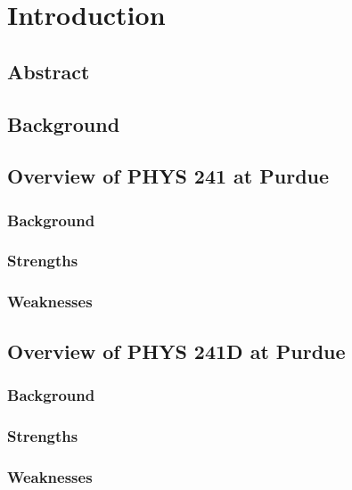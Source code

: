 \chapter[Chapter 1: Introduction]{Introduction}

\section{Abstract}

\section{Background}

\section{Overview of PHYS 241 at Purdue}

\subsection{Background}
\subsection{Strengths}
\subsection{Weaknesses}

\section{Overview of PHYS 241D at Purdue}

\subsection{Background}
\subsection{Strengths}
\subsection{Weaknesses}







